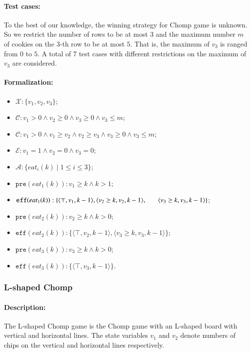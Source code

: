 \documentclass[review]{elsarticle}
\newcommand{\set}[1]{\{ #1 \}}
\newcommand{\tuple}[1]{\langle {#1} \rangle}
\newcommand{\true}{\top}
\newcommand{\statevar}{\mathcal{X}}
\newcommand{\act}{\mathcal{A}}
\newcommand{\constraint}{\mathcal{C}}
\newcommand{\estate}{\mathcal{E}}
\newcommand{\pre}{\mathtt{pre}}
\newcommand{\eff}{\mathtt{eff}}
\begin{document}
\paragraph{Test cases:}
To the best of our knowledge, the winning strategy for Chomp game is unknown.
So we restrict the number of rows to be at most $3$ and the maximum number $m$ of cookies on the $3$-th row to be at most $5$.
That is, the maximum of $v_3$ is ranged from $0$ to $5$.
A total of 7 test cases with different restrictions on the maximum of $v_3$ are considered.
\paragraph{Formalization:}
\begin{itemize}
	\item $\statevar: \set{v_1, v_2, v_3}$;
	\item $\constraint: v_1 > 0 \wedge  v_2 \ge 0 \wedge  v_3 \ge 0 \wedge v_3 \le m$;
	\item {\color{red}$\constraint: v_1 > 0 \wedge v_1 \ge v_2 \wedge v_2 \ge v_3 \wedge v_3 \ge 0 \wedge v_3 \le m$;}
	\item $\estate: v_1 = 1 \wedge  v_2 = 0 \wedge v_3=0$;
	\item $\act:\set{eat_i(k){\mid}1 \le i \le 3}$;
	\item $\pre(eat_1(k)) : v_1 \ge k \wedge k > 1$;
	\item $\eff(eat_1(k)) : \set{\tuple{\true,v_1,k-1}, \tuple{v_2 \ge k,v_2,k-1},\\ \hspace*{6mm}
		\tuple{v_3 \ge k,v_3 ,k-1}}$;
	\item $\pre(eat_2(k)) : v_2 \ge k \wedge  k > 0$;
	\item $\eff(eat_2(k)) :  \set{\tuple{\true,v_2,k-1}, \tuple{v_3 \ge k,v_3 ,k-1}}$;
	\item $\pre(eat_3(k)) : v_3 \ge k \wedge  k > 0$;
	\item $\eff(eat_3(k)) :  \set{\tuple{\true,v_3,k-1}}$.
\end{itemize}




\subsubsection{L-shaped Chomp \protect\cite{Sch1952}}

\paragraph{Description:}  
The L-shaped Chomp game is the Chomp game with an L-shaped board with vertical and horizontal lines. 
The state variables $ v_1$ and $v_2$ denote numbers of chips on the vertical and horizontal lines respectively.
\end{document}

